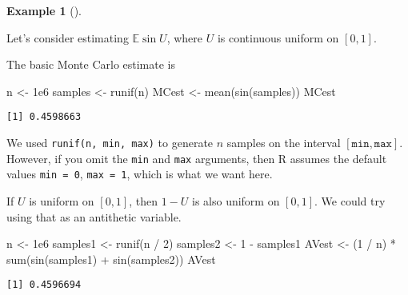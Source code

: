 \documentclass[
  letterpaper,
  DIV=11,
  numbers=noendperiod]{scrreprt}
\newenvironment{Shaded}{\begin{snugshade}}{\end{snugshade}}
\newcommand{\DecValTok}[1]{\textcolor[rgb]{0.68,0.00,0.00}{#1}}
\newcommand{\FloatTok}[1]{\textcolor[rgb]{0.68,0.00,0.00}{#1}}
\newcommand{\FunctionTok}[1]{\textcolor[rgb]{0.28,0.35,0.67}{#1}}
\newcommand{\NormalTok}[1]{\textcolor[rgb]{0.00,0.23,0.31}{#1}}
\newcommand{\OtherTok}[1]{\textcolor[rgb]{0.00,0.23,0.31}{#1}}
\newcommand{\SpecialCharTok}[1]{\textcolor[rgb]{0.37,0.37,0.37}{#1}}
\theoremstyle{plain}
\theoremstyle{definition}
\theoremstyle{definition}
\newtheorem{example}{Example}[chapter]
\theoremstyle{remark}
\begin{document}
\begin{example}[]\protect\hypertarget{exm-AVunif}{}\label{exm-AVunif}

Let's consider estimating \(\mathbb E \sin U\), where \(U\) is
continuous uniform on \([0,1]\).

The basic Monte Carlo estimate is

\begin{Shaded}
\begin{Highlighting}[]
\NormalTok{n }\OtherTok{\textless{}{-}} \FloatTok{1e6}
\NormalTok{samples }\OtherTok{\textless{}{-}} \FunctionTok{runif}\NormalTok{(n)}
\NormalTok{MCest }\OtherTok{\textless{}{-}} \FunctionTok{mean}\NormalTok{(}\FunctionTok{sin}\NormalTok{(samples))}
\NormalTok{MCest}
\end{Highlighting}
\end{Shaded}

\begin{verbatim}
[1] 0.4598663
\end{verbatim}

We used \texttt{runif(n,\ min,\ max)} to generate \(n\) samples on the
interval \([\mathtt{min}, \mathtt{max}]\). However, if you omit the
\texttt{min} and \texttt{max} arguments, then R assumes the default
values \texttt{min\ =\ 0}, \texttt{max\ =\ 1}, which is what we want
here.

If \(U\) is uniform on \([0,1]\), then \(1 - U\) is also uniform on
\([0,1]\). We could try using that as an antithetic variable.

\begin{Shaded}
\begin{Highlighting}[]
\NormalTok{n }\OtherTok{\textless{}{-}} \FloatTok{1e6}
\NormalTok{samples1 }\OtherTok{\textless{}{-}} \FunctionTok{runif}\NormalTok{(n }\SpecialCharTok{/} \DecValTok{2}\NormalTok{)}
\NormalTok{samples2 }\OtherTok{\textless{}{-}} \DecValTok{1} \SpecialCharTok{{-}}\NormalTok{ samples1}
\NormalTok{AVest }\OtherTok{\textless{}{-}}\NormalTok{ (}\DecValTok{1} \SpecialCharTok{/}\NormalTok{ n) }\SpecialCharTok{*} \FunctionTok{sum}\NormalTok{(}\FunctionTok{sin}\NormalTok{(samples1) }\SpecialCharTok{+} \FunctionTok{sin}\NormalTok{(samples2))}
\NormalTok{AVest}
\end{Highlighting}
\end{Shaded}

\begin{verbatim}
[1] 0.4596694
\end{verbatim}

\end{example}
\end{document}

